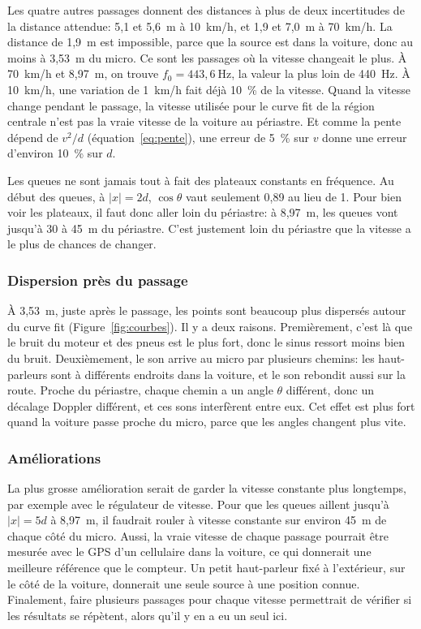 \documentclass[11pt,letterpaper]{article}
\begin{document}
Les quatre autres passages donnent des distances à plus de deux incertitudes de la distance attendue: 5,1 et 5,6~m à 10~km/h, et 1,9 et 7,0~m à 70~km/h. La distance de 1,9~m est impossible, parce que la source est dans la voiture, donc au moins à 3,53~m du micro. Ce sont les passages où la vitesse changeait le plus. À 70~km/h et 8,97~m, on trouve $f_0 = 443{,}6~\text{Hz}$, la valeur la plus loin de 440~Hz. À 10~km/h, une variation de 1~km/h fait déjà 10~\% de la vitesse. Quand la vitesse change pendant le passage, la vitesse utilisée pour le curve fit de la région centrale n'est pas la vraie vitesse de la voiture au périastre. Et comme la pente dépend de $v^2/d$ (équation~\ref{eq:pente}), une erreur de 5~\% sur $v$ donne une erreur d'environ 10~\% sur $d$.

Les queues ne sont jamais tout à fait des plateaux constants en fréquence. Au début des queues, à $|x| = 2d$, $\cos\theta$ vaut seulement 0,89 au lieu de 1. Pour bien voir les plateaux, il faut donc aller loin du périastre: à 8,97~m, les queues vont jusqu'à 30 à 45~m du périastre. C'est justement loin du périastre que la vitesse a le plus de chances de changer.

\subsubsection*{Dispersion près du passage}
À 3,53~m, juste après le passage, les points sont beaucoup plus dispersés autour du curve fit (Figure~\ref{fig:courbes}). Il y a deux raisons. Premièrement, c'est là que le bruit du moteur et des pneus est le plus fort, donc le sinus ressort moins bien du bruit. Deuxièmement, le son arrive au micro par plusieurs chemins: les haut-parleurs sont à différents endroits dans la voiture, et le son rebondit aussi sur la route. Proche du périastre, chaque chemin a un angle $\theta$ différent, donc un décalage Doppler différent, et ces sons interfèrent entre eux. Cet effet est plus fort quand la voiture passe proche du micro, parce que les angles changent plus vite.

\subsubsection*{Améliorations}
La plus grosse amélioration serait de garder la vitesse constante plus longtemps, par exemple avec le régulateur de vitesse. Pour que les queues aillent jusqu'à $|x| = 5d$ à 8,97~m, il faudrait rouler à vitesse constante sur environ 45~m de chaque côté du micro. Aussi, la vraie vitesse de chaque passage pourrait être mesurée avec le GPS d'un cellulaire dans la voiture, ce qui donnerait une meilleure référence que le compteur. Un petit haut-parleur fixé à l'extérieur, sur le côté de la voiture, donnerait une seule source à une position connue. Finalement, faire plusieurs passages pour chaque vitesse permettrait de vérifier si les résultats se répètent, alors qu'il y en a eu un seul ici.
\end{document}
